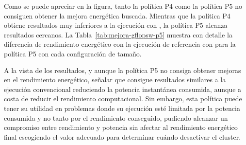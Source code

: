 Como se puede apreciar en la figura, tanto la política P4 como la política
P5 no consiguen obtener la mejora energética buscada. Mientras que la
política P4 obtiene resultados muy inferiores a la ejecución con \botlev,
la política P5 alcanza resultados cercanos. La
Tabla~\ref{tab:mejora-gflopsw-p5} muestra con detalle la diferencia de
rendimiento energético con la ejecución de referencia con \botlev para la
política P5 con cada configuración de tamaño.

A la vista de los resultados, y aunque la política P5 no consiga obtener mejoras
en el rendimiento energético, señalar que consigue resultados similares a
la ejecución convencional reduciendo la potencia instantánea consumida, aunque a
costa de reducir el rendimiento computacional. Sin embargo, esta política
puede tener su utilidad en problemas donde su ejecución esté limitada por
la potencia consumida y no tanto por el rendimiento conseguido, pudiendo
alcanzar un compromiso entre rendimiento y potencia sin afectar al
rendimiento energético final escogiendo el valor adecuado para determinar
cuándo desactivar el cluster.

